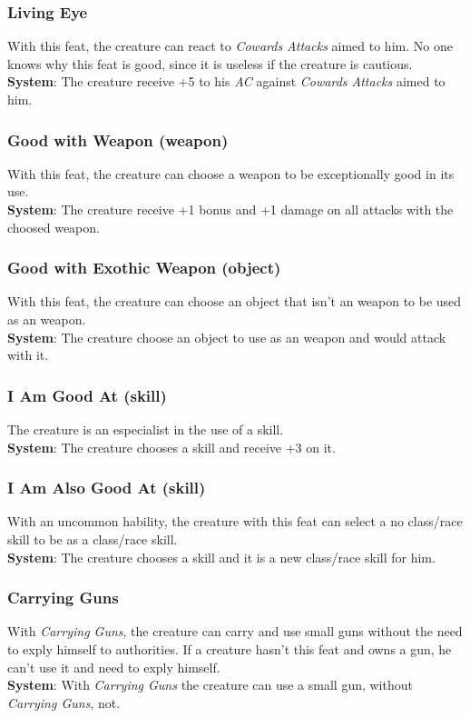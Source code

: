 \documentclass[ letterpaper,12pt]{article}
\begin{document}
\subsubsection{Living Eye}
With this feat, the creature can react to {\it Cowards Attacks} aimed to him. No one knows why this feat is good, since it is useless if the creature is cautious.\\
{\bf System}: The creature receive +5 to his {\it AC} against {\it Cowards Attacks} aimed to him.

\subsubsection{Good with Weapon (weapon)}
With this feat, the creature can choose a weapon to be exceptionally good in its use.\\
{\bf System}: The creature receive +1 bonus and +1 damage on all attacks with the choosed weapon.

\subsubsection{Good with Exothic Weapon (object)}
With this feat, the creature can choose an object that isn't an weapon to be used as an weapon.\\
{\bf System}: The creature choose an object to use as an weapon and would attack with it.

\subsubsection{I Am Good At (skill)}
The creature is an especialist in the use of a skill.\\
{\bf System}: The creature chooses a skill and receive +3 on it.

\subsubsection{I Am Also Good At (skill)}
With an uncommon hability, the creature with this feat can select a no class/race skill to be as a class/race skill.\\
{\bf System}: The creature chooses a skill and it is a new class/race skill for him.

\subsubsection{Carrying Guns}
With {\it Carrying Guns}, the creature can carry and use small guns without the need to exply himself to authorities. If a creature hasn't this feat and owns a gun, he can't use it and need to exply himself.\\
{\bf System}: With {\it Carrying Guns} the creature can use a small gun, without {\it Carrying Guns}, not.
\end{document}
